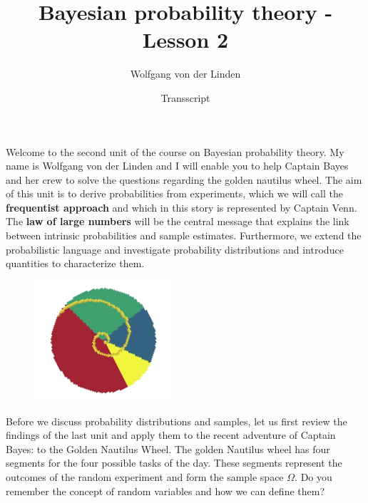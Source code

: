 \documentclass[12pt, a4paper]{scrartcl}
\title{Bayesian probability theory - Lesson 2}
\author{Wolfgang von der Linden}
\date{Transscript}
\begin{document}
\setlength{\parindent}{0pt}
\maketitle
\onehalfspacing

Welcome to the second unit of the course on Bayesian probability theory. My name is Wolfgang von der Linden and I will enable you to help Captain Bayes and her crew to solve the questions regarding the golden nautilus wheel.
The aim of this unit is to derive probabilities from experiments, which we will call the \textbf{frequentist approach} and which in this story is represented by Captain Venn. 
The \textbf{law of large numbers} will be the central message that explains the link between intrinsic probabilities and sample estimates.
Furthermore, we extend the probabilistic language and investigate probability distributions and introduce quantities to characterize them.\\
\begin{figure}[H]
	\centering
	\includegraphics[width=0.45\textwidth]{2_1.png}
\end{figure}
Before we discuss probability distributions and samples, let us first review the findings of the last unit and apply them to the recent adventure of Captain Bayes: to the Golden Nautilus Wheel.
The golden Nautilus wheel has four segments for the four possible tasks of the day. These segments represent the outcomes of the random experiment and form the sample space $\Omega$.
Do you remember the concept of random variables and how we can define them? \\

\\
\end{document}
